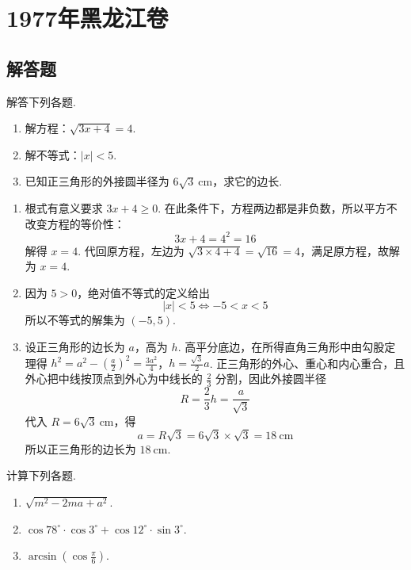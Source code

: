 \chapter{1977年黑龙江卷}

\section{解答题}

\begin{problem}
解答下列各题.

\begin{enumerate}
    \item 解方程：\(\sqrt{3x+4}=4\).

    \item 解不等式：\(\left|x\right|<5\).

    \item 已知正三角形的外接圆半径为 \(6\sqrt{3} \mathrm{~cm}\)，求它的边长.
\end{enumerate}
\end{problem}

\begin{solution}
\begin{enumerate}
    \item 根式有意义要求 \(3x+4\geqslant0\). 在此条件下，方程两边都是非负数，所以平方不改变方程的等价性：
    \[
    3x+4=4^2=16
    \]
    解得 \(x=4\). 代回原方程，左边为 \(\sqrt{3\times4+4}=\sqrt{16}=4\)，满足原方程，故解为 \(x=4\).
    \item 因为 \(5>0\)，绝对值不等式的定义给出
    \[
    \left|x\right|<5\Longleftrightarrow -5<x<5
    \]
    所以不等式的解集为 \(\left(-5,5\right)\).
    \item 设正三角形的边长为 \(a\)，高为 \(h\). 高平分底边，在所得直角三角形中由勾股定理得
\(h^2=a^2-\left(\frac a2\right)^2=\frac{3a^2}{4}\)，\(h=\frac{\sqrt3}{2}a\).
    正三角形的外心、重心和内心重合，且外心把中线按顶点到外心为中线长的 \(\frac23\) 分割，因此外接圆半径
    \[
    R=\frac23h=\frac a{\sqrt3}
    \]
    代入 \(R=6\sqrt3\mathrm{~cm}\)，得
    \[
    a=R\sqrt3=6\sqrt3\times\sqrt3=18\mathrm{~cm}
    \]
    所以正三角形的边长为 \(18\mathrm{~cm}\).
\end{enumerate}
\end{solution}

\begin{problem}
计算下列各题.

\begin{enumerate}
    \item \(\sqrt{m^2-2ma+a^2}\).

    \item \(\cos 78^\circ\cdot\cos 3^\circ+\cos 12^\circ\cdot\sin 3^\circ\).

    \item \(\arcsin\left(\cos\frac{\pi}{6}\right)\).
\end{enumerate}
\end{problem}

